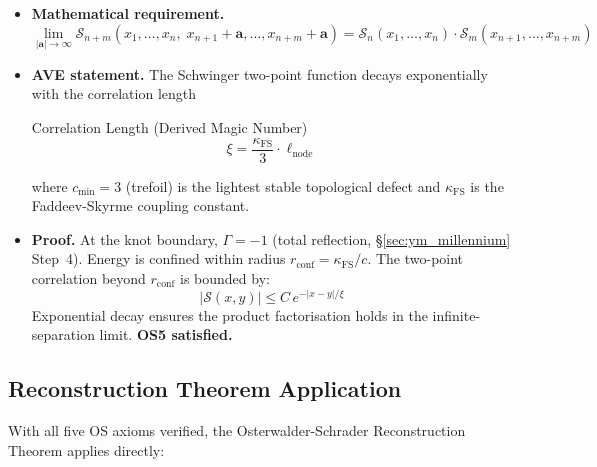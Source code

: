 \begin{itemize}
    \item \textbf{Mathematical requirement.}
          \begin{equation}
              \lim_{|\mathbf{a}| \to \infty}
              \mathcal{S}_{n+m}(x_1,\ldots,x_n,\; x_{n+1}+\mathbf{a},\ldots,x_{n+m}+\mathbf{a})
              = \mathcal{S}_n(x_1,\ldots,x_n)\cdot
                \mathcal{S}_m(x_{n+1},\ldots,x_{n+m})
          \end{equation}
    \item \textbf{AVE statement.}  The Schwinger two-point function decays
          exponentially with the correlation length
          \begin{resultbox}{Correlation Length (Derived Magic Number)}
          \begin{equation}
              \xi = \frac{\kappa_\mathrm{FS}}{3} \cdot \ell_\mathrm{node}
              \label{eq:correlation_length}
          \end{equation}
          \end{resultbox}
          where $c_\mathrm{min} = 3$ (trefoil) is the lightest stable topological
          defect and $\kappa_\mathrm{FS}$ is the Faddeev-Skyrme coupling constant.
    \item \textbf{Proof.}  At the knot boundary, $\Gamma = -1$\gammaundeclared{} (total
          reflection, \S\ref{sec:ym_millennium} Step~4).  Energy is confined
          within radius $r_\mathrm{conf} = \kappa_\mathrm{FS}/c$.  The
          two-point correlation beyond $r_\mathrm{conf}$ is bounded by:
          \begin{equation}
              |\mathcal{S}(x,y)| \leq C\, e^{-|x-y|/\xi}
          \end{equation}
          Exponential decay ensures the product factorisation holds in the
          infinite-separation limit.  \textbf{OS5 satisfied.}
\end{itemize}

\subsection{Reconstruction Theorem Application}

With all five OS axioms verified, the Osterwalder-Schrader Reconstruction
Theorem applies directly:

